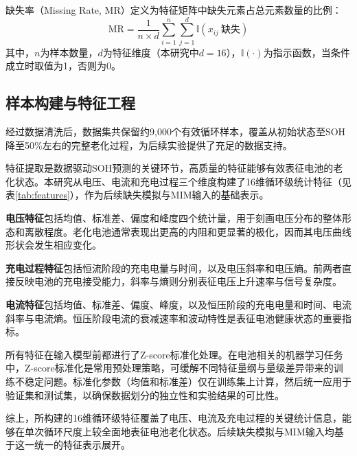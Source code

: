 \documentclass[10pt,a4paper]{ctexart}
\begin{document}
缺失率（Missing Rate, MR）定义为特征矩阵中缺失元素占总元素数量的比例：
\begin{equation}
    \text{MR} = \frac{1}{n \times d} \sum_{i=1}^{n}\sum_{j=1}^{d} \mathbb{I}(x_{ij}\ \text{缺失})
    \label{eq:mr}
\end{equation}
其中，$n$为样本数量，$d$为特征维度（本研究中$d=16$），$\mathbb{I}(\cdot)$为指示函数，当条件成立时取值为1，否则为0。

\subsection{样本构建与特征工程}

经过数据清洗后，数据集共保留约9,000个有效循环样本，覆盖从初始状态至SOH降至50\%左右的完整老化过程，为后续实验提供了充足的数据支持。

特征提取是数据驱动SOH预测的关键环节，高质量的特征能够有效表征电池的老化状态\cite{sun2025batteryhealth,wang2022chargingfeatures}。本研究从电压、电流和充电过程三个维度构建了16维循环级统计特征（见表\ref{tab:features}），作为后续缺失模拟与MIM输入的基础表示。

\textbf{电压特征}包括均值、标准差、偏度和峰度四个统计量，用于刻画电压分布的整体形态和离散程度。老化电池通常表现出更高的内阻和更显著的极化，因而其电压曲线形状会发生相应变化。

\textbf{充电过程特征}包括恒流阶段的充电电量与时间，以及电压斜率和电压熵。前两者直接反映电池的充电接受能力，斜率与熵则分别表征电压上升速率与信号复杂度。

\textbf{电流特征}包括均值、标准差、偏度、峰度，以及恒压阶段的充电电量和时间、电流斜率与电流熵。恒压阶段电流的衰减速率和波动特性是表征电池健康状态的重要指标。

所有特征在输入模型前都进行了Z-score标准化处理。在电池相关的机器学习任务中，Z-score标准化是常用预处理策略，可缓解不同特征量纲与量级差异带来的训练不稳定问题\cite{xue2024batteryml}。标准化参数（均值和标准差）仅在训练集上计算，然后统一应用于验证集和测试集，以确保数据划分的独立性和实验结果的可比性。

综上，所构建的16维循环级特征覆盖了电压、电流及充电过程的关键统计信息，能够在单次循环尺度上较全面地表征电池老化状态。后续缺失模拟与MIM输入均基于这一统一的特征表示展开。
\end{document}
